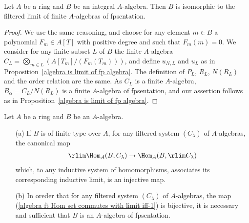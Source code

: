 \begin{corollary}\label{algebra integral is limit of finite fp algebra}
Let $A$ be a ring and $B$ be an integral $A$-algebra. Then $B$ is isomorphic to the filtered limit of finite $A$-algebras of fpsentation.
\end{corollary}
\begin{proof}
We use the same reasoning, and choose for any element $m\in B$ a polynomial $F_m\in A[T]$ with positive degree and such that $F_m(m)=0$. We consider for any finite subset $L$ of $B$ the finite $A$-algebra $C_L=\bigotimes_{m\in L}(A[T_m]/(F_m(T_m)))$, and define $u_{N,L}$ and $u_L$ as in Proposition~\ref{algebra is limit of fp algebra}. The definition of $P_L$, $R_L$, $N(R_L)$ and the order relation are the same. As $C_L$ is a finite $A$-algebra, $B_\alpha=C_L/N(R_L)$ is a finite $A$-algebra of fpsentation, and our assertion follows as in Proposition~\ref{algebra is limit of fp algebra}.
\end{proof}
\begin{proposition}\label{algebra ft Hom set commutes with limit iff}
Let $A$ be a ring and $B$ be an $A$-algebra.
\begin{itemize}
\item[(a)] If $B$ is of finite type over $A$, for any filtered system $(C_\lambda)$ of $A$-algebras, the canonical map
\begin{align}\label{algebra ft Hom set commutes with limit iff-1}
\rlim\Hom_{A}(B,C_\lambda)\to\Hom_{A}(B,\rlim C_\lambda)
\end{align}
which, to any inductive system of homomorphisms, associates its corresponding inductive limit, is an injective map.
\item[(b)] In oreder that for any filtered system $(C_\lambda)$ of $A$-algebras, the map (\ref{algebra ft Hom set commutes with limit iff-1}) is bijective, it is necessary and sufficient that $B$ is an $A$-algebra of fpsentation.
\end{itemize}
\end{proposition}
